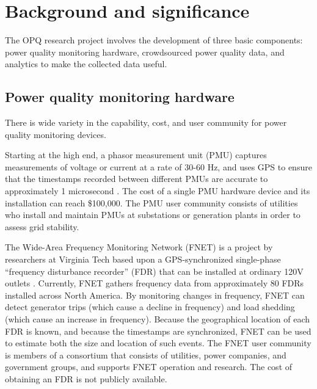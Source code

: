 
\section{Background and significance}


The OPQ research project involves the development of three basic components: power quality monitoring hardware, crowdsourced power quality data, and analytics to make the collected data useful. 

\subsection{Power quality monitoring hardware}

There is wide variety in the capability, cost, and user community for power quality monitoring devices.

Starting at the high end, a phasor measurement unit (PMU) captures measurements of voltage or current at a rate of 30-60 Hz, and uses GPS to ensure that the timestamps recorded between different PMUs are accurate to approximately 1 microsecond \cite{Zhang2007}. The cost of a single PMU hardware device and its installation can reach \$100,000. The PMU user community consists of utilities who install and maintain PMUs at substations or generation plants in order to assess grid stability.

The Wide-Area Frequency Monitoring Network (FNET) is a project by researchers at Virginia Tech based upon a GPS-synchronized single-phase ``frequency disturbance recorder'' (FDR) that can be installed at ordinary 120V outlets \cite{Zhang2010}. Currently, FNET gathers frequency data from approximately 80 FDRs installed across North America.  By monitoring changes in frequency, FNET can detect generator trips (which cause a decline in frequency) and load shedding (which cause an increase in frequency). Because the geographical location of each FDR is known, and because the timestamps are synchronized, FNET can be used to estimate both the size and location of such events. The FNET user community is members of a consortium that consists of utilities, power companies, and government groups, and supports FNET operation and research.  The cost of obtaining an FDR is not publicly available.

